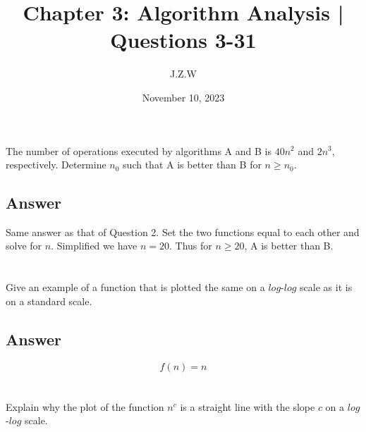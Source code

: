 \documentclass{article}
\begin{document}
\title{Chapter 3: Algorithm Analysis | Questions 3-31}
\author{J.Z.W}
\date{November 10, 2023}

\maketitle

\setcounter{section}{2}

\section{}

The number of operations executed by algorithms A and B is \(40n^2\) and \(2n^3\),
respectively. Determine \(n_0\) such that A is better than B for \(n \geq n_0\).

\subsection{Answer}
\begin{mdframed}

Same answer as that of Question 2. Set the two functions equal to each other
  and solve for \(n\). Simplified we have \(n = 20\). Thus for \(n \geq 20\), A
  is better than B.

\end{mdframed}

\section{}

Give an example of a function that is plotted the same on a \(log\)-\(log\) scale as it
is on a standard scale.

\subsection{Answer}
\begin{mdframed}

\begin{equation*}
    f(n) = n
\end{equation*}

\end{mdframed}

\section{}

Explain why the plot of the function \(n^c\) is a straight line with the slope
\(c\) on a \(log\)-\(log\) scale.
\end{document}
